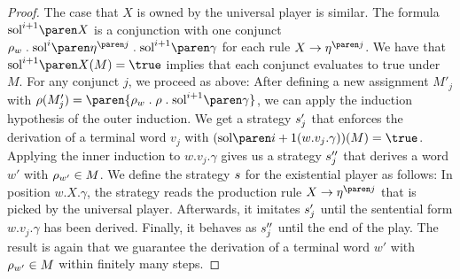 \documentclass[../../diss.tex]{subfiles}
\begin{document}
\begin{proof}
    The case that $X$ is owned by the universal player is similar.
    The formula $\sol{i+1}{X}$ is a conjunction with one conjunct $\tbox{w} \comp \sol{i}{\itr{\eta}{j}} \comp \sol{i+1}{\gamma}$ for each rule $X \to \itr{\eta}{j}$.
    We have that $\sol{i+1}{X}(M) = \true$ implies that each conjunct evaluates to true under $M$.
    For any conjunct $j$, we proceed as above:
    After defining a new assignment $M'_j$ with $\tbox(M'_j) = \paren{ \tbox{w} \comp \tbox \comp \sol{i+1}{\gamma}}$, we can apply the induction hypothesis of the outer induction.
    We get a strategy $s'_j$ that enforces the derivation of a terminal word $v_j$ with $(\sol{i+1}(w.v_j.\gamma))(M) = \true$.
    Applying the inner induction to $w.v_j.\gamma$ gives us a strategy $s_j''$ that derives a word $w'$ with $\tbox{w'} \in M$.
    We define the strategy $s$ for the existential player as follows:
    In position $w.X.\gamma$, the strategy reads the production rule $X \to \itr{\eta}{j}$ that is picked by the universal player.
    Afterwards, it imitates $s'_j$ until the sentential form $w.v_j.\gamma$ has been derived.
    Finally, it behaves as $s''_j$ until the end of the play.
    The result is again that we guarantee the derivation of a terminal word $w'$ with $\tbox{w'} \in M$ within finitely many steps.
\end{proof}
\end{document}
